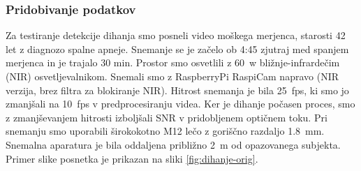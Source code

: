 \subsubsection{Pridobivanje podatkov}
Za testiranje detekcije dihanja smo posneli video moškega merjenca, starosti 42 let z diagnozo spalne apneje. Snemanje se je začelo ob 4:45 zjutraj med spanjem merjenca in je trajalo 30 min. Prostor smo osvetlili z \SI{60}{w} bližnje-infrardečim (NIR) osvetljevalnikom. Snemali smo z RaspberryPi RaspiCam  napravo (NIR verzija, brez filtra za blokiranje NIR). Hitrost snemanja je bila \SI{25}{fps}, ki smo jo zmanjšali na \SI{10}{fps} v predprocesiranju videa. Ker je dihanje počasen proces, smo z zmanjševanjem hitrosti izboljšali SNR v pridobljenem optičnem toku. Pri snemanju smo uporabili širokokotno M12 lečo z goriščno razdaljo \SI{1.8}{mm}. Snemalna aparatura je bila oddaljena približno \SI{2}{m} od opazovanega subjekta. Primer slike posnetka je prikazan na sliki \ref{fig:dihanje-orig}.

